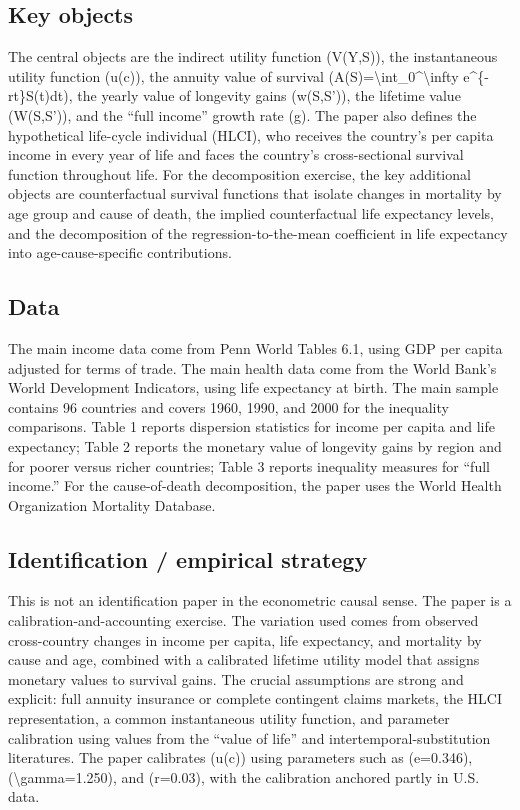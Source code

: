 \documentclass[11pt,a4paper]{article}
\begin{document}
\subsection*{Key objects}
The central objects are the indirect utility function (V(Y,S)), the instantaneous utility function (u(c)), the annuity value of survival (A(S)=\textbackslash{}int\_0\textasciicircum{}\textbackslash{}infty e\textasciicircum{}\{-rt\}S(t)dt), the yearly value of longevity gains (w(S,S')), the lifetime value (W(S,S')), and the “full income” growth rate (g). The paper also defines the hypothetical life-cycle individual (HLCI), who receives the country’s per capita income in every year of life and faces the country’s cross-sectional survival function throughout life. For the decomposition exercise, the key additional objects are counterfactual survival functions that isolate changes in mortality by age group and cause of death, the implied counterfactual life expectancy levels, and the decomposition of the regression-to-the-mean coefficient in life expectancy into age-cause-specific contributions.

\subsection*{Data}
The main income data come from Penn World Tables 6.1, using GDP per capita adjusted for terms of trade. The main health data come from the World Bank’s World Development Indicators, using life expectancy at birth. The main sample contains 96 countries and covers 1960, 1990, and 2000 for the inequality comparisons. Table 1 reports dispersion statistics for income per capita and life expectancy; Table 2 reports the monetary value of longevity gains by region and for poorer versus richer countries; Table 3 reports inequality measures for “full income.” For the cause-of-death decomposition, the paper uses the World Health Organization Mortality Database.

\subsection*{Identification / empirical strategy}
This is not an identification paper in the econometric causal sense. The paper is a calibration-and-accounting exercise. The variation used comes from observed cross-country changes in income per capita, life expectancy, and mortality by cause and age, combined with a calibrated lifetime utility model that assigns monetary values to survival gains. The crucial assumptions are strong and explicit: full annuity insurance or complete contingent claims markets, the HLCI representation, a common instantaneous utility function, and parameter calibration using values from the “value of life” and intertemporal-substitution literatures. The paper calibrates (u(c)) using parameters such as (e=0.346), (\textbackslash{}gamma=1.250), and (r=0.03), with the calibration anchored partly in U.S. data.
\end{document}
